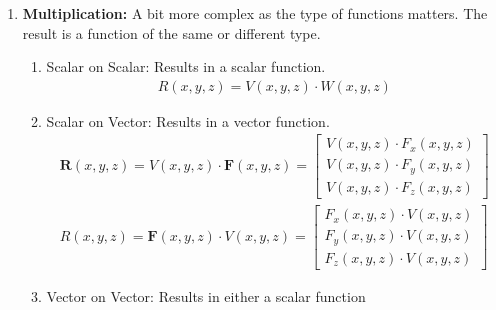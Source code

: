 \begin{enumerate}
\begin{enumerate}
\begin{align*}
          \mathbf{R}(x, y, z) = \mathbf{F}(x, y, z) - \mathbf{G}(x, y, z)
                              = \begin{bmatrix}
                                  F_x(x, y, z) - G_x(x, y, z) \\
                                  F_y(x, y, z) - G_y(x, y, z) \\
                                  F_z(x, y, z) - G_z(x, y, z)
                                \end{bmatrix}
        \end{align*}
    \end{enumerate}
    \item \textbf{Multiplication:} A bit more complex as the type of
      functions matters. The result is a function of the same or
      different type.
      \begin{enumerate}
        \item Scalar on Scalar: Results in a scalar function.
          \begin{align*}
            R(x, y, z) = V(x, y, z) \cdot W(x, y, z)
          \end{align*}
        \item Scalar on Vector: Results in a vector function.
          \begin{align*}
            \mathbf{R}(x, y, z) = V(x, y, z) \cdot \mathbf{F}(x, y, z)
                                = \begin{bmatrix}
                                    V(x, y, z) \cdot F_x(x, y, z) \\
                                    V(x, y, z) \cdot F_y(x, y, z) \\
                                    V(x, y, z) \cdot F_z(x, y, z)
                                  \end{bmatrix} \\
                  R(x, y, z) = \mathbf{F}(x, y, z) \cdot V(x, y, z)
                                = \begin{bmatrix}
                                    F_x(x, y, z) \cdot V(x, y, z) \\
                                    F_y(x, y, z) \cdot V(x, y, z) \\
                                    F_z(x, y, z) \cdot V(x, y, z)
                                  \end{bmatrix}
          \end{align*}
        \item Vector on Vector: Results in either a scalar function

\end{enumerate}
\end{enumerate}
